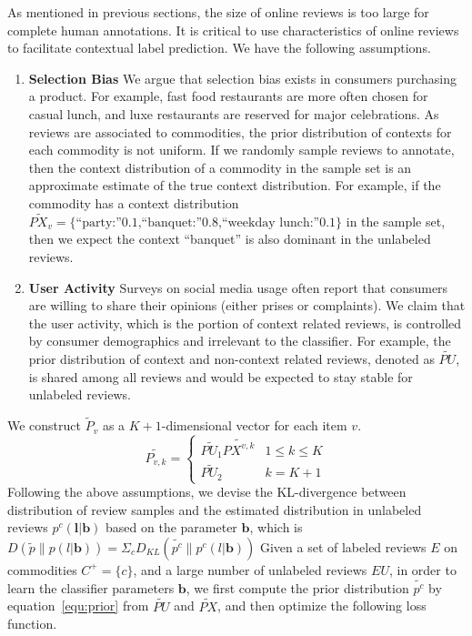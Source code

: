 \documentclass[preprint,12pt]{elsarticle}
\begin{document}
As mentioned in previous sections, the size of online reviews is too large for complete human annotations. It is critical to use characteristics of online reviews to facilitate contextual label prediction. We have the following assumptions.
\begin{enumerate}
  \item \textbf{Selection Bias} We argue that selection bias exists in consumers purchasing a product. For example, fast food restaurants are more often chosen for casual lunch, and luxe restaurants are reserved for major celebrations. As reviews are associated to commodities, the prior distribution of contexts for each commodity is not uniform. If we randomly sample reviews to annotate, then the context distribution of a commodity in the sample set is an approximate estimate of the true context distribution. For example, if the commodity has a context distribution $\tilde{PX_v}=\{\textrm{``party:''0.1,``banquet:''0.8,``weekday lunch:''0.1}\}$ in the sample set, then we expect the context ``banquet'' is also dominant in the unlabeled reviews.
  \item \textbf{User Activity} Surveys on social media usage often report that consumers are willing to share their opinions (either prises or complaints). We claim that the user activity, which is the portion of context related reviews, is controlled by consumer demographics and irrelevant to the classifier. For example, the prior distribution of context and non-context related reviews, denoted as $\tilde{PU}$, is shared among all reviews and would be expected to stay stable for unlabeled reviews. 
\end{enumerate}
We construct $\tilde{P}_v$ as a $K+1$-dimensional vector for each item $v$.
\begin{equation}\label{equ:prior}
\tilde{P_{v,k}}=
\left\{
\begin{array}{cc}
\tilde{PU_1} \tilde{PX^{v,k}}& 1\leq k\leq K\\
\tilde{PU_2} &  k = K+1
\end{array} \right.
\end{equation}
Following the above assumptions, we devise the KL-divergence between distribution of review samples and the estimated distribution in unlabeled reviews $p^c(\mathbf{l}|\mathbf{b})$ based on the parameter $\mathbf{b}$, which is $D(\tilde{p}\|p(l|\mathbf{b}))\!=\!\Sigma_{c}D_{KL}(\tilde{p^c}\|p^c(l|\mathbf{b}))$
Given a set of labeled reviews $E$ on commodities $C^+=\{c\}$, and a large number of unlabeled reviews $EU$, in order to learn the classifier parameters $\mathbf{b}$, we first compute the prior distribution $\tilde{p^c}$ by equation~\ref{equ:prior} from $\tilde{PU}$ and $\tilde{PX}$, and then optimize the following loss function.
\end{document}
